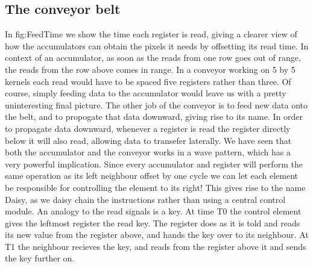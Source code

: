\subsection{The conveyor belt}
In fig:FeedTime we show the time each register is read, giving a clearer view of how the accumulators can obtain the pixels it needs by offsetting its read time.
In context of an accumulator, as soon as the reads from one row goes out of range, the reads from the row above comes in range. In a conveyor working on 5 by 5 kernels each read would have to be spaced five registers rather than three.
Of course, simply feeding data to the accumulator would leave us with a pretty uninteresting final picture. 
The other job of the conveyor is to feed new data onto the belt, and to propogate that data downward, giving rise to its name. 
In order to propagate data downward, whenever a register is read the register directly below it will also read, allowing data to transefer laterally.
We have seen that both the accumulator and the conveyor works in a wave pattern, which has a very powerful implication.
Since every accumulator and register will perform the same operation as its left neighbour offset by one cycle we can let each element be responsible for controlling the element to its right!
This gives rise to the name Daisy, as we daisy chain the instructions rather than using a central control module.
An analogy to the read signals is a key. At time T0 the control element gives the leftmost register the read key. 
The register does as it is told and reads its new value from the register above, and hands the key over to its neighbour. 
At T1 the neighbour recieves the key, and reads from the register above it and sends the key further on.

